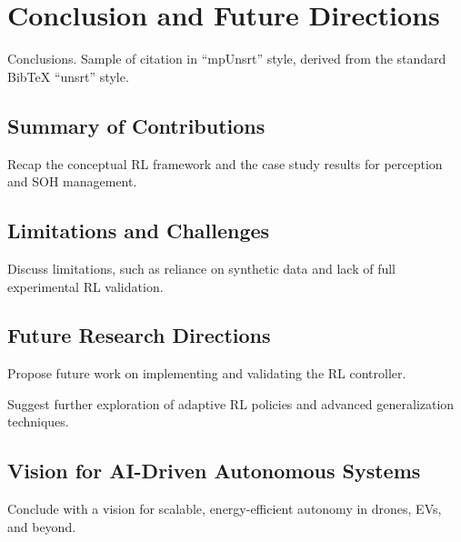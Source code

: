 \chapter{Conclusion and Future Directions}\label{ch:7}
\minitoc

Conclusions. Sample of citation in ``mpUnsrt'' style, derived from the standard {Bib\TeX} ``unsrt'' style.

\newpage

\section{Summary of Contributions}

Recap the conceptual RL framework and the case study results for perception and SOH management.


\section{Limitations and Challenges}

Discuss limitations, such as reliance on synthetic data and lack of full experimental RL validation.


\section{Future Research Directions}

Propose future work on implementing and validating the RL controller.

Suggest further exploration of adaptive RL policies and advanced generalization techniques.


\section{Vision for AI-Driven Autonomous Systems}

Conclude with a vision for scalable, energy-efficient autonomy in drones, EVs, and beyond.

\endinput